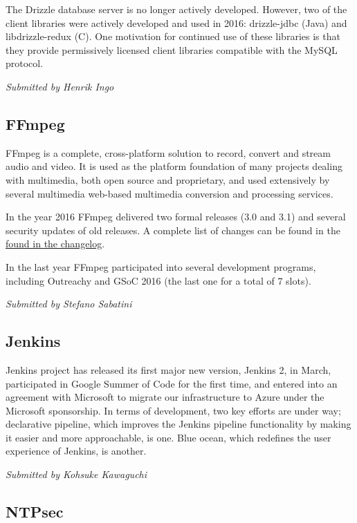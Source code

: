\documentclass[letterpaper]{report}
\begin{document}
The Drizzle database server is no longer actively developed. However,
two of the client libraries were actively developed and used in 2016:
drizzle-jdbc (Java) and libdrizzle-redux (C). One motivation for
continued use of these libraries is that they provide permissively
licensed client libraries compatible with the MySQL protocol.

{\em Submitted by Henrik Ingo}

\subsection{FFmpeg}

FFmpeg is a complete, cross-platform solution to record, convert and
stream audio and video. It is used as the platform foundation of many
projects dealing with multimedia, both open source and proprietary, and
used extensively by several multimedia web-based multimedia conversion
and processing services.

In the year 2016 FFmpeg delivered two formal releases (3.0 and 3.1) and
several security updates of old releases. A complete list of changes can
be found in the
\href{http://git.videolan.org/?p=ffmpeg.git;a=blob_plain;f=Changelog;hb=HEAD}{found
in the changelog}.

In the last year FFmpeg participated into several development programs,
including Outreachy and GSoC 2016 (the last one for a total of 7 slots).

{\em Submitted by Stefano Sabatini}

\subsection{Jenkins}

Jenkins project has released its first major new version, Jenkins 2, in
March, participated in Google Summer of Code for the first time, and
entered into an agreement with Microsoft to migrate our infrastructure
to Azure under the Microsoft sponsorship. In terms of development, two
key efforts are under way; declarative pipeline, which improves the
Jenkins pipeline functionality by making it easier and more
approachable, is one.  Blue ocean, which redefines the user experience
of Jenkins, is another.

{\em Submitted by Kohsuke Kawaguchi}

\subsection{NTPsec}
\end{document}
